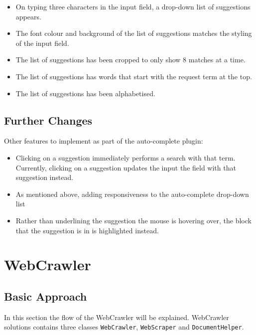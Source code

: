 \begin{itemize}
    \item On typing three characters in the input field, a drop-down list of suggestions appears.
    \item The font colour and background of the list of suggestions matches the styling of the input field.
    \item The list of suggestions has been cropped to only show 8 matches at a time.
    \item The list of suggestions has words that start with the request term at the top.
    \item The list of suggestions has been alphabetised.
\end{itemize}

\subsection{Further Changes}
Other features to implement as part of the auto-complete plugin:

\begin{itemize}
    \item Clicking on a suggestion immediately performs a search with that term. Currently, clicking on a suggestion updates the input the field with that suggestion instead.
    \item As mentioned above, adding responsiveness to the auto-complete drop-down list
    \item Rather than underlining the suggestion the mouse is hovering over, the block that the suggestion is in is highlighted instead.
\end{itemize}

\section{WebCrawler}
\subsection{Basic Approach}

In this section the flow of the WebCrawler will be explained.
WebCrawler solutions contains three classes {\tt WebCrawler}, {\tt WebScraper} and {\tt DocumentHelper}.


